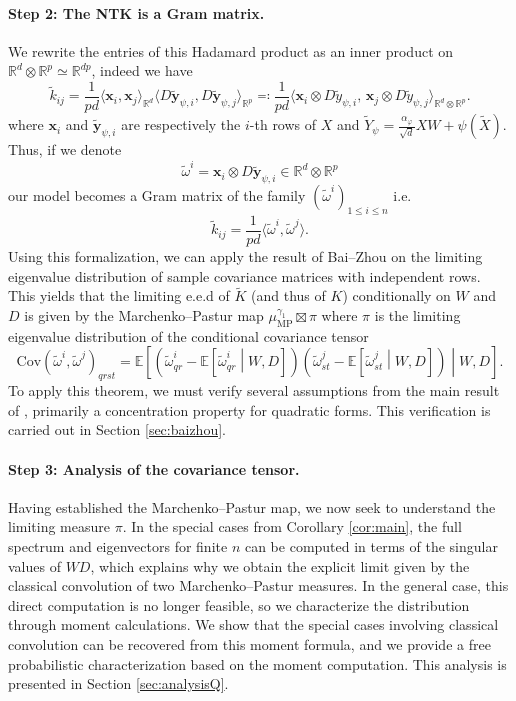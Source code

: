 \documentclass[letterpaper, 10pt, dvipsnames]{article}
\numberwithin{equation}{section}
\newcommand{\Rbb}{\mathbb{R}}
\newcommand{\x}{\mathbf{x}}
\newcommand{\y}{\mathbf{y}}
\renewcommand{\phi}{\varphi}
\renewcommand{\tilde}{\widetilde}
\newcommand{\E}{\mathds{E}}
\theoremstyle{definition}
\begin{document}
\paragraph{Step 2: The NTK is a Gram matrix.}
We rewrite the entries of this Hadamard product as an inner product  on $\Rbb^d\otimes \Rbb^p \simeq \Rbb^{dp}$, indeed we have 
\[
\tilde{k}_{ij} = 
\frac{1}{pd}\langle \x_i,\x_j\rangle_{\Rbb^d} 
\langle D \tilde{\y}_{\psi,i},D\tilde{\y}_{\psi,j}\rangle_{\Rbb^p}  
\eqqcolon 
\frac{1}{pd}\langle \x_i \otimes D\tilde{y}_{\psi,i},\, \x_j\otimes D\tilde{y}_{\psi,j}\rangle_{\Rbb^d\otimes \Rbb^p}.     
\]
where $\x_i$ and $\tilde{\y}_{\psi,i}$ are respectively the $i$-th rows of $X$ and $\widetilde{Y}_\psi = \frac{\alpha_\phi}{\sqrt{d}}XW+\psi(\widetilde{X})$. Thus, if we denote 
\begin{equation}\label{eq:defomega}
\tilde{\omega}^i = \x_i \otimes D\tilde{\y}_{\psi,i} \in \Rbb^{d}\otimes \Rbb^p    
\end{equation}
our model becomes a Gram matrix of the family $(\tilde{\omega}^i)_{1\leqslant i\leqslant n}$ i.e. 
\[
\tilde{k}_{ij} = \frac{1}{pd}\langle \tilde{\omega}^i,\tilde{\omega}^j\rangle.    
\]
Using this formalization, we can apply the result of Bai--Zhou \cite{baizhou} on the limiting eigenvalue distribution of sample covariance matrices with independent rows. This yields that the limiting e.e.d of $\widetilde{K}$ (and thus of $K$) conditionally on $W$ and $D$ is given by the Marchenko--Pastur map $\mu_{\mathrm{MP}}^{\gamma_1}\boxtimes \pi$ where $\pi$ is the limiting eigenvalue distribution of the conditional covariance tensor 
\[
\mathrm{Cov}(\tilde{\omega}^i,\tilde{\omega}^j)_{qrst}
=
\E\left[
  \left(
    \tilde{\omega}^i_{qr}-\E\left[\tilde{\omega}^i_{qr}\middle\vert W,D\right]
  \right)
  \left(
    \tilde{\omega}^j_{st}-\E\left[\tilde{\omega}^j_{st}\middle\vert W,D\right]
  \right)
  \middle\vert W,D
\right].
\] 
To apply this theorem, we must verify several assumptions from the main result of \cite{baizhou}, primarily a concentration property for quadratic forms. This verification is carried out in Section \ref{sec:baizhou}.
\paragraph{Step 3: Analysis of the covariance tensor.} Having established the Marchenko--Pastur map, we now seek to understand the limiting measure $\pi$. In the special cases from Corollary \ref{cor:main}, the full spectrum and eigenvectors for finite $n$ can be computed in terms of the singular values of $WD$, which explains why we obtain the explicit limit given by the classical convolution of two Marchenko--Pastur measures. In the general case, this direct computation is no longer feasible, so we characterize the distribution through moment calculations. We show that the special cases involving classical convolution can be recovered from this moment formula, and we provide a free probabilistic characterization based on the moment computation. This analysis is presented in Section \ref{sec:analysisQ}.
\end{document}
